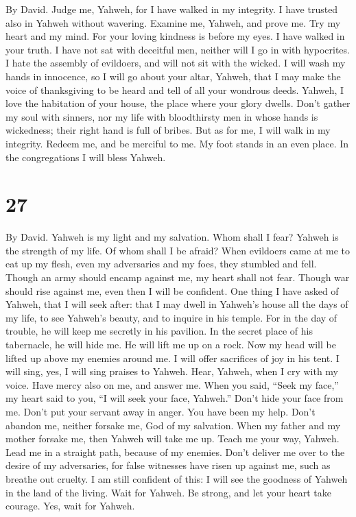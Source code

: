 By David.  Judge me, Yahweh, for I have walked in my
integrity. I have trusted also in Yahweh without wavering. 
Examine me, Yahweh, and prove me. Try my heart and my mind. 
For your loving kindness is before my eyes. I have walked in your truth.
 I have not sat with deceitful men, neither will I go in
with hypocrites.  I hate the assembly of evildoers, and will
not sit with the wicked.  I will wash my hands in innocence,
so I will go about your altar, Yahweh,  that I may make the
voice of thanksgiving to be heard and tell of all your wondrous deeds.
 Yahweh, I love the habitation of your house, the place
where your glory dwells.  Don't gather my soul with sinners,
nor my life with bloodthirsty men  in whose hands is
wickedness; their right hand is full of bribes.  But as for
me, I will walk in my integrity. Redeem me, and be merciful to me.
 My foot stands in an even place. In the congregations I
will bless Yahweh.

\hypertarget{section-26}{%
\section{27}\label{section-26}}

By David.  Yahweh is my light and my salvation. Whom shall I
fear? Yahweh is the strength of my life. Of whom shall I be afraid?
 When evildoers came at me to eat up my flesh, even my
adversaries and my foes, they stumbled and fell.  Though an
army should encamp against me, my heart shall not fear. Though war
should rise against me, even then I will be confident.  One
thing I have asked of Yahweh, that I will seek after: that I may dwell
in Yahweh's house all the days of my life, to see Yahweh's beauty, and
to inquire in his temple.  For in the day of trouble, he
will keep me secretly in his pavilion. In the secret place of his
tabernacle, he will hide me. He will lift me up on a rock. 
Now my head will be lifted up above my enemies around me. I will offer
sacrifices of joy in his tent. I will sing, yes, I will sing praises to
Yahweh.  Hear, Yahweh, when I cry with my voice. Have mercy
also on me, and answer me.  When you said, ``Seek my face,''
my heart said to you, ``I will seek your face, Yahweh.'' 
Don't hide your face from me. Don't put your servant away in anger. You
have been my help. Don't abandon me, neither forsake me, God of my
salvation.  When my father and my mother forsake me, then
Yahweh will take me up.  Teach me your way, Yahweh. Lead me
in a straight path, because of my enemies.  Don't deliver
me over to the desire of my adversaries, for false witnesses have risen
up against me, such as breathe out cruelty.  I am still
confident of this: I will see the goodness of Yahweh in the land of the
living.  Wait for Yahweh. Be strong, and let your heart
take courage. Yes, wait for Yahweh.

